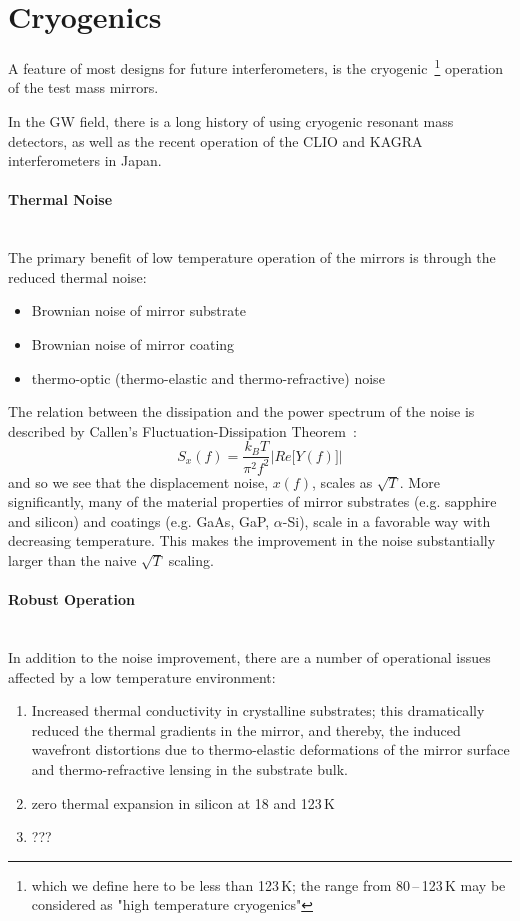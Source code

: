 \section{Cryogenics}
\label{s:Cryogenics}
A feature of most designs for future interferometers, is the 
cryogenic~\footnote{which we define here to be less than 123\,K; the range from 80\,--\,123\,K may be considered as "high temperature cryogenics"} operation of the test mass mirrors\cite{ET, Voyager}.

In the GW field, there is a long history of using cryogenic resonant mass detectors\cite{coldBars}, as well as the recent operation of the CLIO and KAGRA interferometers in Japan.

\paragraph{Thermal Noise}\mbox{}\\
The primary benefit of low temperature operation of the mirrors is through the reduced thermal noise:
\begin{itemize}
\item Brownian noise of mirror substrate
\item Brownian noise of mirror coating
\item thermo-optic (thermo-elastic and thermo-refractive) noise
\end{itemize}
The relation between the dissipation and the power spectrum of the noise is described by Callen's Fluctuation-Dissipation Theorem~\cite{CaWe1951, Kubo:FDT, Callen:1959}:
\begin{equation}
S_x(f) = \frac{k_B T}{\pi^2 f^2} \left| Re \big[ Y(f) \big]\right|
\label{eq:FDT}
\end{equation}
and so we see that the displacement noise, $x(f)$, scales as $\sqrt{T}$. More significantly, many of the material properties of mirror substrates (e.g. sapphire and silicon) and coatings (e.g. GaAs, GaP, $\alpha$-Si), scale in a favorable way with decreasing temperature. This makes the improvement in the noise substantially larger than the naive $\sqrt{T}$ scaling.

\paragraph{Robust Operation}\mbox{}\\
In addition to the noise improvement, there are a number of operational issues affected by a low temperature environment:
\begin{enumerate}
\item Increased thermal conductivity in crystalline substrates; this dramatically reduced the thermal gradients in the mirror, and thereby, the induced wavefront distortions due to thermo-elastic deformations of the mirror surface and thermo-refractive lensing in the substrate bulk.

\item zero thermal expansion in silicon at 18 and 123\,K

\item ???
\end{enumerate}



